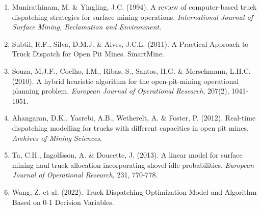 \documentclass[12pt,a4paper]{article}
\begin{document}
\begin{enumerate}
    \item Munirathinam, M. \& Yingling, J.C. (1994). A review of computer-based truck dispatching strategies for surface mining operations. \textit{International Journal of Surface Mining, Reclamation and Environment}.
    
    \item Subtil, R.F., Silva, D.M.J. \& Alves, J.C.L. (2011). A Practical Approach to Truck Dispatch for Open Pit Mines. SmartMine\textregistered.
    
    \item Souza, M.J.F., Coelho, I.M., Ribas, S., Santos, H.G. \& Merschmann, L.H.C. (2010). A hybrid heuristic algorithm for the open-pit-mining operational planning problem. \textit{European Journal of Operational Research}, 207(2), 1041-1051.
    
    \item Ahangaran, D.K., Yasrebi, A.B., Wetherelt, A. \& Foster, P. (2012). Real-time dispatching modelling for trucks with different capacities in open pit mines. \textit{Archives of Mining Sciences}.
    
    \item Ta, C.H., Ingolfsson, A. \& Doucette, J. (2013). A linear model for surface mining haul truck allocation incorporating shovel idle probabilities. \textit{European Journal of Operational Research}, 231, 770-778.
    
    \item Wang, Z. et al. (2022). Truck Dispatching Optimization Model and Algorithm Based on 0-1 Decision Variables.
\end{enumerate}

\vfill
\end{document}
